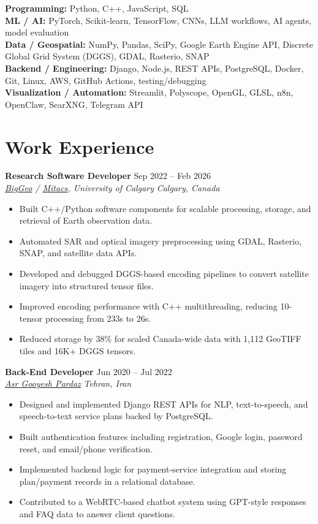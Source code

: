 \documentclass[a4paper,10pt]{article}
\newcommand{\resumeSubheading}[4]{
    \textbf{#1} \hfill #2 \\
    \textit{#3} \hfill \textit{#4}
}
\begin{document}
\textbf{Programming:} Python, C++, JavaScript, SQL \\
\textbf{ML / AI:} PyTorch, Scikit-learn, TensorFlow, CNNs, LLM workflows, AI agents, model evaluation \\
\textbf{Data / Geospatial:} NumPy, Pandas, SciPy, Google Earth Engine API, Discrete Global Grid System (DGGS), GDAL, Rasterio, SNAP \\
\textbf{Backend / Engineering:} Django, Node.js, REST APIs, PostgreSQL, Docker, Git, Linux, AWS, GitHub Actions, testing/debugging \\
\textbf{Visualization / Automation:} Streamlit, Polyscope, OpenGL, GLSL, n8n, OpenClaw, SearXNG, Telegram API


\section*{Work Experience}

\resumeSubheading
{Research Software Developer}
{Sep 2022 -- Feb 2026}
{\href{https://biggeo.com}{BigGeo} / \href{https://www.mitacs.ca/}{Mitacs}, University of Calgary}
{Calgary, Canada}
\begin{itemize}[leftmargin=0.25in]
    \item Built C++/Python software components for scalable processing, storage, and retrieval of Earth observation data.
    \item Automated SAR and optical imagery preprocessing using GDAL, Rasterio, SNAP, and satellite data APIs.
    \item Developed and debugged DGGS-based encoding pipelines to convert satellite imagery into structured tensor files.
    \item Improved encoding performance with C++ multithreading, reducing 10-tensor processing from 233s to 26s.
    \item Reduced storage by 38\% for scaled Canada-wide data with 1,112 GeoTIFF tiles and 16K+ DGGS tensors.
\end{itemize}

\resumeSubheading
{Back-End Developer}
{Jun 2020 -- Jul 2022}
{\href{https://asr-gooyesh.com/en/}{Asr Gooyesh Pardaz}}
{Tehran, Iran}
\begin{itemize}[leftmargin=0.25in]
    \item Designed and implemented Django REST APIs for NLP, text-to-speech, and speech-to-text service plans backed by PostgreSQL.
    \item Built authentication features including registration, Google login, password reset, and email/phone verification.
    \item Implemented backend logic for payment-service integration and storing plan/payment records in a relational database.
    \item Contributed to a WebRTC-based chatbot system using GPT-style responses and FAQ data to answer client questions.
\end{itemize}
\end{document}
